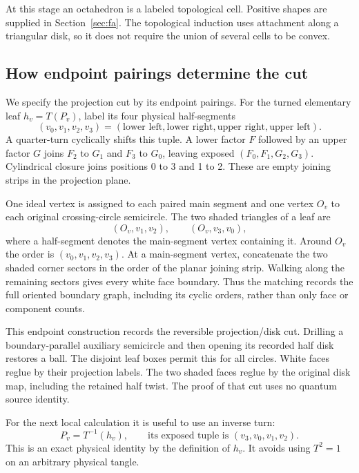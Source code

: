 At this stage an octahedron is a labeled topological cell. Positive
shapes are supplied in Section~\ref{sec:fa}. The topological induction
uses attachment along a triangular disk, so it does not require the
union of several cells to be convex.

\subsection{How endpoint pairings determine the cut}\label{sec:ft-2}

We specify the projection cut by its endpoint pairings. For the turned elementary leaf \(h_v=T(P_v)\), label its four physical half-segments
\begin{equation}
(v_0,v_1,v_2,v_3)
 =(\text{lower left},\text{lower right},
   \text{upper right},\text{upper left}).
\label{eq:ft-2}
\end{equation}
A quarter-turn cyclically shifts this tuple. A lower factor \(F\) followed by an upper factor \(G\) joins \(F_2\) to \(G_1\) and \(F_3\) to \(G_0\), leaving exposed \((F_0,F_1,G_2,G_3)\). Cylindrical closure joins positions 0 to 3 and 1 to 2. These are empty joining strips in the projection plane.

One ideal vertex is assigned to each paired main segment and one vertex \(O_v\) to each original crossing-circle semicircle. The two shaded triangles of a leaf are
\begin{equation}
(O_v,v_1,v_2),\qquad (O_v,v_3,v_0),
\label{eq:ft-3}
\end{equation}
where a half-segment denotes the main-segment vertex containing it.
Around \(O_v\) the order is \((v_0,v_1,v_2,v_3)\). At a main-segment
vertex, concatenate the two shaded corner sectors in the order of the
planar joining strip. Walking along the remaining sectors gives every
white face boundary. Thus the matching records the full oriented
boundary graph, including its cyclic orders, rather than only face or
component counts.

This endpoint construction records the reversible projection/disk cut. Drilling a boundary-parallel auxiliary semicircle and then opening its recorded half disk restores a ball. The disjoint leaf boxes permit this for all circles. White faces reglue by their projection labels. The two shaded faces reglue by the original disk map, including the retained half twist. The proof of that cut uses no quantum source identity.

For the next local calculation it is useful to use an inverse turn:
\begin{equation}
P_v=T^{-1}(h_v),\qquad
 \text{its exposed tuple is }(v_3,v_0,v_1,v_2).
\label{eq:ft-4}
\end{equation}
This is an exact physical identity by the definition of \(h_v\). It avoids using \(T^2=1\) on an arbitrary physical tangle.

